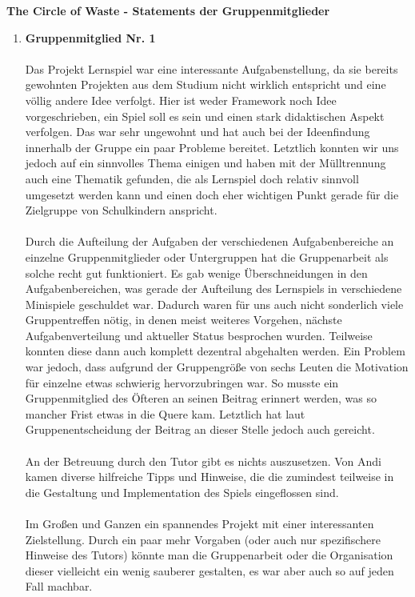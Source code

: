 \documentclass[a4paper]{article}
\newcommand{\changefont}[3]{
\fontfamily{#1} \fontseries{#2} \fontshape{#3} \selectfont}
\begin{document}
\changefont{cmss}{m}{n} %

\begin{center}
\textbf{\Large The Circle of Waste - Statements der Gruppenmitglieder}
\end{center}

\vspace{5mm}


\begin{enumerate}
    \item \textbf{Gruppenmitglied Nr. 1}\\
    \\
    Das Projekt Lernspiel war eine interessante Aufgabenstellung, da sie bereits gewohnten Projekten aus dem Studium nicht wirklich entspricht und eine völlig andere Idee verfolgt. Hier ist weder Framework noch Idee vorgeschrieben, ein Spiel soll es sein und einen stark didaktischen Aspekt verfolgen. Das war sehr ungewohnt und hat auch bei der Ideenfindung innerhalb der Gruppe ein paar Probleme bereitet. Letztlich konnten wir uns jedoch auf ein sinnvolles Thema einigen und haben mit der Mülltrennung auch eine Thematik gefunden, die als Lernspiel doch relativ sinnvoll umgesetzt werden kann und einen doch eher wichtigen Punkt gerade für die Zielgruppe von Schulkindern anspricht.\\
    \\
    Durch die Aufteilung der Aufgaben der verschiedenen Aufgabenbereiche an einzelne Gruppenmitglieder oder Untergruppen hat die Gruppenarbeit als solche recht gut funktioniert. Es gab wenige Überschneidungen in den Aufgabenbereichen, was gerade der Aufteilung des Lernspiels in verschiedene Minispiele geschuldet war. Dadurch waren für uns auch nicht sonderlich viele Gruppentreffen nötig, in denen meist weiteres Vorgehen, nächste Aufgabenverteilung und aktueller Status besprochen wurden. Teilweise konnten diese dann auch komplett dezentral abgehalten werden. Ein Problem war jedoch, dass aufgrund der Gruppengröße von sechs Leuten die Motivation für einzelne etwas schwierig hervorzubringen war. So musste ein Gruppenmitglied des Öfteren an seinen Beitrag erinnert werden, was so mancher Frist etwas in die Quere kam. Letztlich hat laut Gruppenentscheidung der Beitrag an dieser Stelle jedoch auch gereicht.\\
    \\
    An der Betreuung durch den Tutor gibt es nichts auszusetzen. Von Andi kamen diverse hilfreiche Tipps und Hinweise, die die zumindest teilweise in die Gestaltung und Implementation des Spiels eingeflossen sind.\\
    \\
    Im Großen und Ganzen ein spannendes Projekt mit einer interessanten Zielstellung. Durch ein paar mehr Vorgaben (oder auch nur spezifischere Hinweise des Tutors) könnte man die Gruppenarbeit oder die Organisation dieser vielleicht ein wenig sauberer gestalten, es war aber auch so auf jeden Fall machbar.\\
    \\


\end{enumerate}
\end{document}
